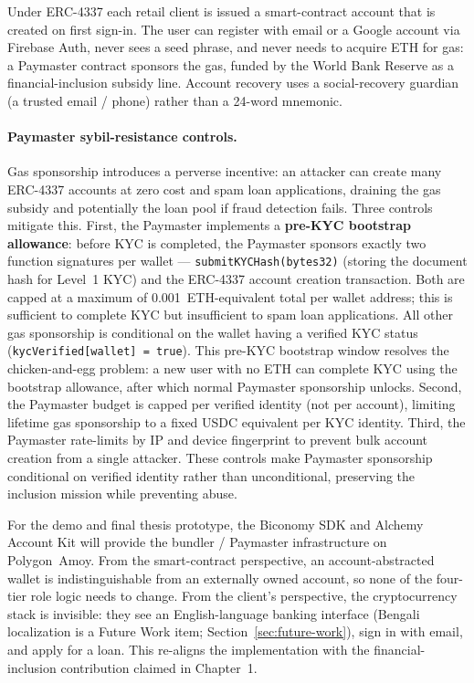 \documentclass[12pt,a4paper]{report}
\begin{document}
Under ERC-4337 each retail client is issued a smart-contract account that is created on first sign-in. The user can register with email or a Google account via Firebase Auth, never sees a seed phrase, and never needs to acquire ETH for gas: a Paymaster contract sponsors the gas, funded by the World Bank Reserve as a financial-inclusion subsidy line. Account recovery uses a social-recovery guardian (a trusted email / phone) rather than a 24-word mnemonic.

\paragraph{Paymaster sybil-resistance controls.}
Gas sponsorship introduces a perverse incentive: an attacker can create many ERC-4337 accounts at zero cost and spam loan applications, draining the gas subsidy and potentially the loan pool if fraud detection fails. Three controls mitigate this. First, the Paymaster implements a \textbf{pre-KYC bootstrap allowance}: before KYC is completed, the Paymaster sponsors exactly two function signatures per wallet --- \texttt{submitKYCHash(bytes32)} (storing the document hash for Level~1 KYC) and the ERC-4337 account creation transaction. Both are capped at a maximum of 0.001~ETH-equivalent total per wallet address; this is sufficient to complete KYC but insufficient to spam loan applications. All other gas sponsorship is conditional on the wallet having a verified KYC status (\texttt{kycVerified[wallet] = true}). This pre-KYC bootstrap window resolves the chicken-and-egg problem: a new user with no ETH can complete KYC using the bootstrap allowance, after which normal Paymaster sponsorship unlocks. Second, the Paymaster budget is capped per verified identity (not per account), limiting lifetime gas sponsorship to a fixed USDC equivalent per KYC identity. Third, the Paymaster rate-limits by IP and device fingerprint to prevent bulk account creation from a single attacker. These controls make Paymaster sponsorship conditional on verified identity rather than unconditional, preserving the inclusion mission while preventing abuse.

For the demo and final thesis prototype, the Biconomy SDK and Alchemy Account Kit will provide the bundler / Paymaster infrastructure on Polygon~Amoy. From the smart-contract perspective, an account-abstracted wallet is indistinguishable from an externally owned account, so none of the four-tier role logic needs to change. From the client's perspective, the cryptocurrency stack is invisible: they see an English-language banking interface (Bengali localization is a Future Work item; Section~\ref{sec:future-work}), sign in with email, and apply for a loan. This re-aligns the implementation with the financial-inclusion contribution claimed in Chapter~1.
\end{document}
